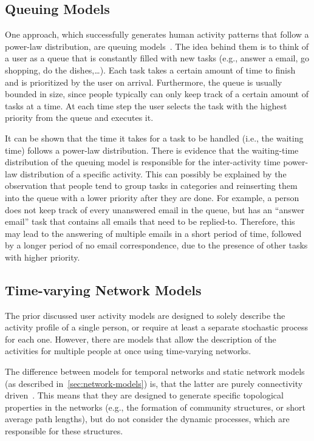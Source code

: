 \subsection{Queuing Models}
\label{subsec:queuing-models}

One approach, which successfully generates human activity patterns that follow a power-law distribution, are queuing models~\cite{Vazquez2006}.
The idea behind them is to think of a user as a queue that is constantly filled with new tasks (e.g., answer a email, go shopping, do the dishes,\ldots).
Each task takes a certain amount of time to finish and is prioritized by the user on arrival.
Furthermore, the queue is usually bounded in size, since people typically can only keep track of a certain amount of tasks at a time.
At each time step the user selects the task with the highest priority from the queue and executes it.

It can be shown that the time it takes for a task to be handled (i.e., the waiting time) follows a power-law distribution.
There is evidence that the waiting-time distribution of the queuing model is responsible for the inter-activity time power-law distribution of a specific activity.
This can possibly be explained by the observation that people tend to group tasks in categories and reinserting them into the queue with a lower priority after they are done.
For example, a person does not keep track of every unanswered email in the queue, but has an \enquote{answer email} task that contains all emails that need to be replied-to.
Therefore, this may lead to the answering of multiple emails in a short period of time, followed by a longer period of no email correspondence, due to the presence of other tasks with higher priority.


\subsection{Time-varying Network Models}
\label{subsec:time-varying-network-models}

The prior discussed user activity models are designed to solely describe the activity profile of a single person, or require at least a separate stochastic process for each one.
However, there are models that allow the description of the activities for multiple people at once using time-varying networks.

The difference between models for temporal networks and static network models (as described in~\cref{sec:network-models}) is, that the latter are purely connectivity driven~\cite{Perra2012a}.
This means that they are designed to generate specific topological properties in the networks (e.g., the formation of community structures, or short average path lengths), but do not consider the dynamic processes, which are responsible for these structures.

